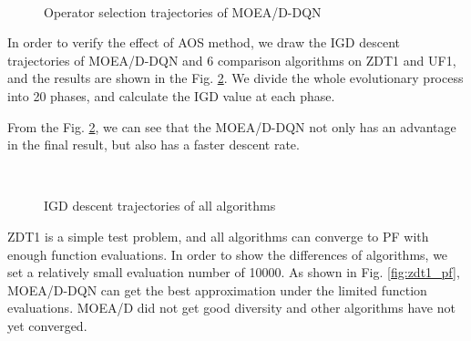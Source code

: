 \documentclass[journal]{IEEEtran}
\begin{document}
\begin{figure}[]
  \centering
  \hfil
  \\
  \caption{Operator selection trajectories of MOEA/D-DQN}
  \label{fig:ops_tra}
\end{figure}

In order to verify the effect of AOS method, we draw the IGD descent trajectories of MOEA/D-DQN and 6 comparison algorithms on ZDT1 and UF1, and the results are shown in the Fig. \ref{fig:igd_tra}.
We divide the whole evolutionary process into 20 phases, and calculate the IGD value at each phase.

From the Fig. \ref{fig:igd_tra}, we can see that the MOEA/D-DQN not only has an advantage in the final result, but also has a faster descent rate.

\begin{figure}[]
  \centering
  \hfil
  \\
  \caption{IGD descent trajectories of all algorithms}
  \label{fig:igd_tra}
\end{figure}


ZDT1 is a simple test problem, and all algorithms can converge to PF with enough function evaluations. In order to show the differences of algorithms, we set a relatively small evaluation number of 10000.
As shown in Fig. \ref{fig:zdt1_pf}, MOEA/D-DQN can get the best approximation under the limited function evaluations. MOEA/D did not get good diversity and other algorithms have not yet converged.
\end{document}
